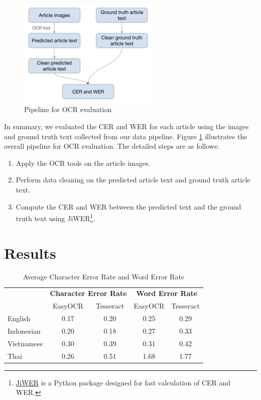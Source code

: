 \documentclass[12pt,oneside]{memoir}
\begin{document}
\begin{figure}[ht]
    \centering
    \includegraphics[width=0.6\textwidth]{images/ocr-evaluation.png}
    \caption{Pipeline for OCR evaluation}
    \label{figure:ocr-evaluation}
\end{figure}

In summary, we evaluated the CER and WER for each article using the images and 
ground truth text collected from our data pipeline. Figure \ref{figure:ocr-evaluation} 
illustrates the overall pipeline for OCR evaluation. The detailed steps are as follows:

\begin{enumerate}
    \item Apply the OCR tools on the article images.
    \item Perform data cleaning on the predicted article text and ground truth article text.
    \item Compute the CER and WER between the predicted text and the ground truth text using JiWER\footnote{\href{https://pypi.org/project/jiwer/}{JiWER} is a Python package designed for fast calculation of CER and WER.}.
\end{enumerate}

\chapter{Results}

\begin{table}[ht]
    \centering
    \begin{tabular}{lcccc}
        \toprule
        & \multicolumn{2}{c}{\textbf{Character Error Rate}} & \multicolumn{2}{c}{\textbf{Word Error Rate}}\\
        \cmidrule(lr){2-3}\cmidrule(lr){4-5}
        & EasyOCR & Tesseract & EasyOCR & Tesseract\\
        \midrule
        English & 0.17 & 0.20 & 0.25 & 0.29\\
        Indonesian & 0.20 & 0.18 & 0.27 & 0.33\\
        Vietnamese & 0.30 & 0.39 & 0.31 & 0.42\\
        Thai & 0.26 & 0.51 & 1.68 & 1.77\\
        \bottomrule
    \end{tabular}
    \caption{Average Character Error Rate and Word Error Rate}
    \label{table:results}
\end{table}
\end{document}
